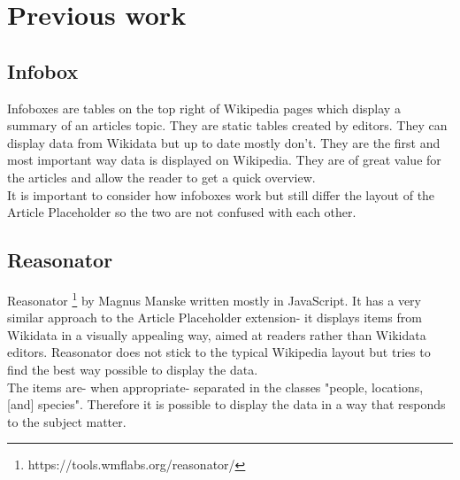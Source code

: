 \section{Previous work}
\subsection{Infobox}
Infoboxes are tables on the top right of Wikipedia pages which display a summary of an articles topic. They are static tables created by editors. They can display data from Wikidata but up to date mostly don't. They are the first and most important way data is displayed on Wikipedia. They are of great value for the articles and allow the reader to get a quick overview. \\
It is important to consider how infoboxes work but still differ the layout of the Article Placeholder so the two are not confused with each other.

\subsection{Reasonator}
Reasonator \footnote{https://tools.wmflabs.org/reasonator/} by Magnus Manske written mostly in JavaScript. It has a very similar approach to the Article Placeholder extension- it displays items from Wikidata in a visually appealing way, aimed at readers rather than Wikidata editors. Reasonator does not stick to the typical Wikipedia layout but tries to find the best way possible to display the data. \\
The items are- when appropriate- separated in the classes   "people, locations, [and] species". Therefore it is possible to display the data in a way that responds to the subject matter. \\

